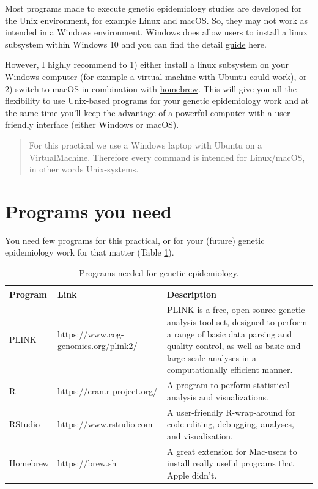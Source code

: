 \documentclass[
]{book}
\begin{document}
Most programs made to execute genetic epidemiology studies are developed for the Unix environment, for example Linux and macOS. So, they may not work as intended in a Windows environment. Windows does allow users to install a linux subsystem within Windows 10 and you can find the detail \href{https://docs.microsoft.com/en-us/windows/wsl/about}{guide} here.

However, I highly recommend to 1) either install a linux subsystem on your Windows computer (for example \href{https://blog.storagecraft.com/the-dead-simple-guide-to-installing-a-linux-virtual-machine-on-windows/}{a virtual machine with Ubuntu could work}), or 2) switch to macOS in combination with \href{https://brew.sh}{homebrew}. This will give you all the flexibility to use Unix-based programs for your genetic epidemiology work and at the same time you'll keep the advantage of a powerful computer with a user-friendly interface (either Windows or macOS).

\begin{quote}
For this practical we use a Windows laptop with Ubuntu on a VirtualMachine. Therefore every command is intended for Linux/macOS, in other words Unix-systems.
\end{quote}

\hypertarget{programs-you-need}{%
\section{Programs you need}\label{programs-you-need}}

You need few programs for this practical, or for your (future) genetic epidemiology work for that matter (Table \ref{tab:programs}).

\begin{table}

\caption{\label{tab:programs}Programs needed for genetic epidemiology.}
\centering
\begin{tabular}[t]{l|l|l}
\hline
Program & Link & Description\\
\hline
PLINK & https://www.cog-genomics.org/plink2/ & PLINK is a free, open-source genetic analysis tool set, designed to perform a range of basic data parsing and quality control, as well as basic and large-scale analyses in a computationally efficient manner.\\
\hline
R & https://cran.r-project.org/ & A program to perform statistical analysis and visualizations.\\
\hline
RStudio & https://www.rstudio.com & A user-friendly R-wrap-around for code editing, debugging, analyses, and visualization.\\
\hline
Homebrew & https://brew.sh & A great extension for Mac-users to install really useful programs that Apple didn't.\\
\hline
\end{tabular}
\end{table}
\end{document}
